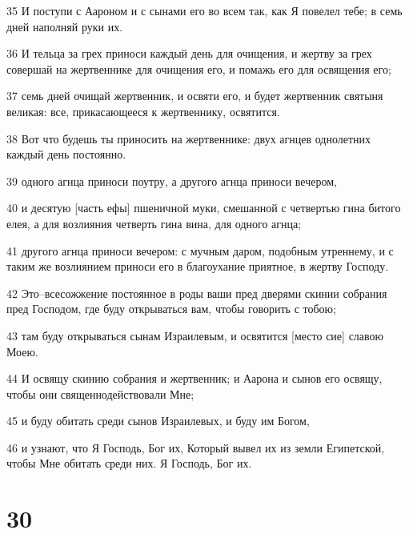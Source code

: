 \par 35 И поступи с Аароном и с сынами его во всем так, как Я повелел тебе; в семь дней наполняй руки их.
\par 36 И тельца за грех приноси каждый день для очищения, и жертву за грех совершай на жертвеннике для очищения его, и помажь его для освящения его;
\par 37 семь дней очищай жертвенник, и освяти его, и будет жертвенник святыня великая: все, прикасающееся к жертвеннику, освятится.
\par 38 Вот что будешь ты приносить на жертвеннике: двух агнцев однолетних каждый день постоянно.
\par 39 одного агнца приноси поутру, а другого агнца приноси вечером,
\par 40 и десятую [часть ефы] пшеничной муки, смешанной с четвертью гина битого елея, а для возлияния четверть гина вина, для одного агнца;
\par 41 другого агнца приноси вечером: с мучным даром, подобным утреннему, и с таким же возлиянием приноси его в благоухание приятное, в жертву Господу.
\par 42 Это--всесожжение постоянное в роды ваши пред дверями скинии собрания пред Господом, где буду открываться вам, чтобы говорить с тобою;
\par 43 там буду открываться сынам Израилевым, и освятится [место сие] славою Моею.
\par 44 И освящу скинию собрания и жертвенник; и Аарона и сынов его освящу, чтобы они священнодействовали Мне;
\par 45 и буду обитать среди сынов Израилевых, и буду им Богом,
\par 46 и узнают, что Я Господь, Бог их, Который вывел их из земли Египетской, чтобы Мне обитать среди них. Я Господь, Бог их.

\chapter{30}

